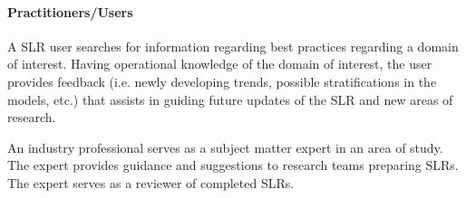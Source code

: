 \paragraph{Practitioners/Users}
A SLR user searches for information regarding best practices regarding a domain of interest.  
Having operational knowledge of the domain of interest, the user provides feedback (i.e. newly developing trends, possible stratifications in the models, etc.) that assists in guiding future updates of the SLR and new areas of research. 

An industry professional serves as a subject matter expert in an area of study.  
The expert provides guidance and suggestions to research teams preparing SLRs.  
The expert serves as a reviewer of completed SLRs.
